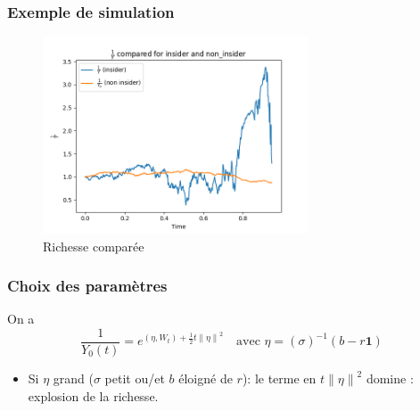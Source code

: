 \documentclass{beamer}
\begin{document}
\begin{frame}
\frametitle{Exemple de simulation}
\begin{figure}[H]
  \centering
    \includegraphics[width=0.7\textwidth]{images/simulation_1/compared_wealths.png}
  \caption{Richesse comparée}
\end{figure}
\end{frame}

\begin{frame}
\frametitle{Choix des paramètres}
\par On a 
\begin{displaymath}
\frac{1}{Y_0 \left( t \right)} = e^{ \left( \eta, W_{t} \right) + \frac{1}{2} t {\| \eta \|}^{2}} \quad \text{avec } \eta = (\sigma)^{-1} (b - r \textbf{1})
\end{displaymath}
\begin{itemize}
\item Si $\eta$ grand ($\sigma$ petit ou/et $b$ éloigné de $r$): le terme en $t {\| \eta \|}^{2}$ domine : explosion de la richesse.
\end{itemize}
\end{frame}
\end{document}
